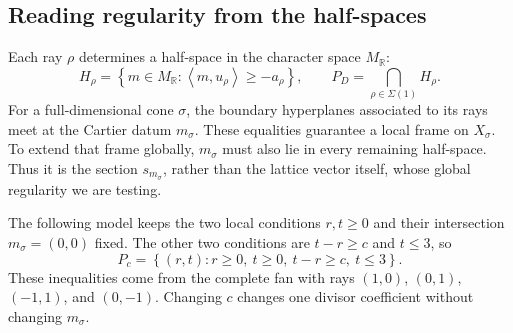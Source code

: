 \documentclass[11pt]{article}
\theoremstyle{definition}
\theoremstyle{remark}
\newcommand{\Sg}{\Sigma}
\newcommand{\set}[1]{\left\{#1\right\}}
\newcommand{\braket}[2]{\left\langle #1,#2\right\rangle}
\newcommand{\bR}{\mathbb{R}}
\begin{document}
\subsection{Reading regularity from the half-spaces}

Each ray \(\rho\) determines a half-space in the character space
\(M_\bR\):
\[
    H_\rho=\set{m\in M_\bR:\braket{m}{u_\rho}\geq-a_\rho},
    \qquad P_D=\bigcap_{\rho\in\Sg(1)}H_\rho.
\]
For a full-dimensional cone \(\sigma\), the boundary hyperplanes
associated to its rays meet at the Cartier datum \(m_\sigma\).
These equalities guarantee a local frame on \(X_\sigma\). To extend
that frame globally, \(m_\sigma\) must also lie in every remaining
half-space. Thus it is the section \(s_{m_\sigma}\), rather than the
lattice vector itself, whose global regularity we are testing.

The following model keeps the two local conditions \(r,t\geq0\) and
their intersection \(m_\sigma=(0,0)\) fixed. The other two conditions
are \(t-r\geq c\) and \(t\leq3\), so
\[
    P_c=\set{(r,t):r\geq0,\ t\geq0,\ t-r\geq c,\ t\leq3}.
\]
These inequalities come from the complete fan with rays
\((1,0)\), \((0,1)\), \((-1,1)\), and \((0,-1)\).
Changing \(c\) changes one divisor coefficient without changing
\(m_\sigma\).
\end{document}
